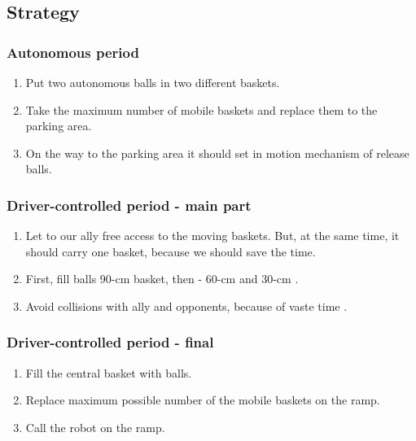 \subsection{Strategy} 
\subsubsection{Autonomous period}
\begin{enumerate}
    \item Put two autonomous balls in two different baskets.
	\item Take the maximum number of mobile baskets and replace them to the parking area.
	\item On the way to the parking area it should set in motion mechanism of release balls.
	         
\end{enumerate}
\subsubsection{Driver-controlled period - main part}
\begin{enumerate}
	\item Let to our ally free access to the moving baskets. But, at the same time, it should carry one basket, because we should save the time.
	\item First, fill balls 90-cm basket, then - 60-cm and 30-cm .
	\item Avoid collisions with ally and opponents, because of vaste time .
\end{enumerate}
\subsubsection{Driver-controlled period - final}
\begin{enumerate}
	\item Fill the central basket with balls.
	\item Replace maximum possible number of the mobile baskets on the ramp.
	\item Call the robot on the ramp. 
\end{enumerate}
\fillpage

